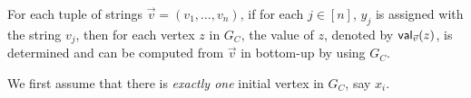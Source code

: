 \documentclass{llncs}
\newcommand{\zhilin}[1]{\color{cyan} {ZL: #1 :LZ} \color{black}}
\begin{document}
For each tuple of strings $\vec{v}=(v_1,\dots, v_n)$, if for each $j \in [n]$, $y_j$ is assigned with the string $v_j$, then for each vertex $z$ in $G_C$, the value of $z$, denoted by $\mathsf{val}_{\vec{v}}(z)$, is determined and can be computed from $\vec{v}$ in bottom-up by using $G_C$. 





We first assume that there is \emph{exactly  one} initial vertex in $G_C$, say $x_i$. 
\end{document}
